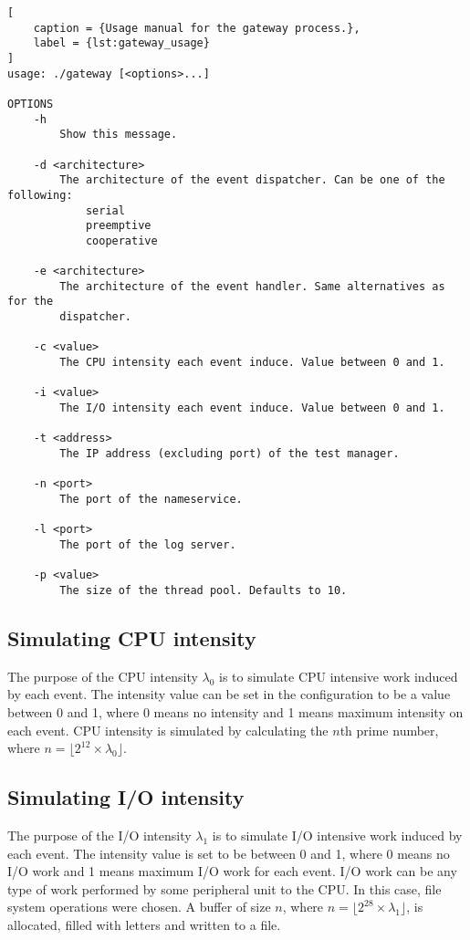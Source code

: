 \begin{lstlisting}[
    caption = {Usage manual for the gateway process.},
    label = {lst:gateway_usage}
]
usage: ./gateway [<options>...]

OPTIONS
    -h
        Show this message.

    -d <architecture>
        The architecture of the event dispatcher. Can be one of the following:
            serial
            preemptive
            cooperative

    -e <architecture>
        The architecture of the event handler. Same alternatives as for the
        dispatcher.

    -c <value>
        The CPU intensity each event induce. Value between 0 and 1.

    -i <value>
        The I/O intensity each event induce. Value between 0 and 1.

    -t <address>
        The IP address (excluding port) of the test manager.

    -n <port>
        The port of the nameservice.

    -l <port>
        The port of the log server.

    -p <value>
        The size of the thread pool. Defaults to 10.
\end{lstlisting}

\subsection{Simulating CPU intensity}

The purpose of the CPU intensity $\lambda_0$ is to simulate CPU intensive work
induced by each event. The intensity value can be set in the configuration to
be a value between 0 and 1, where 0 means no intensity and 1 means maximum
intensity on each event. CPU intensity is simulated by calculating the $n$th
prime number, where $n = \lfloor 2^{12} \times \lambda_0 \rfloor$.

\subsection{Simulating I/O intensity}

The purpose of the I/O intensity $\lambda_1$ is to simulate I/O intensive work
induced by each event. The intensity value is set to be between 0 and 1, where
0 means no I/O work and 1 means maximum I/O work for each event. I/O work can
be any type of work performed by some peripheral unit to the CPU. In this case,
file system operations were chosen. A buffer of size $n$, where $n = \lfloor
2^{28} \times \lambda_1 \rfloor$, is allocated, filled with letters and written
to a file.


